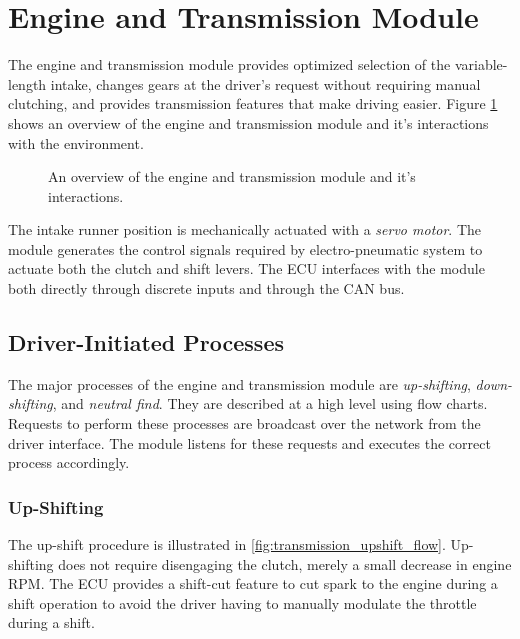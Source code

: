 \section{Engine and Transmission Module\label{sec:engine_transmission_design}}

The engine and transmission module provides optimized selection of the variable-length intake, changes gears at the driver's request without requiring manual clutching, and provides transmission features that make driving easier. Figure \ref{fig:design_engine_overview_block} shows an overview of the engine and transmission module and it's interactions with the environment.

\begin{figure}[H]
	\centering
 	
	\caption{An overview of the engine and transmission module and it's interactions.}
	\label{fig:design_engine_overview_block}
\end{figure}

The intake runner position is mechanically actuated with a \emph{servo motor}. The module generates the control signals required by electro-pneumatic system to actuate both the clutch and shift levers. The ECU interfaces with the module both directly through discrete inputs and through the CAN bus.

\subsection{Driver-Initiated Processes}

The major processes of the engine and transmission module are \emph{up-shifting}, \emph{down-shifting}, and \emph{neutral find}. They are described at a high level using flow charts. Requests to perform these processes are broadcast over the network from the driver interface. The module listens for these requests and executes the correct process accordingly.

\subsubsection{Up-Shifting}

The up-shift procedure is illustrated in \ref{fig:transmission_upshift_flow}. Up-shifting does not require disengaging the clutch, merely a small decrease in engine RPM. The ECU provides a shift-cut feature to cut spark to the engine during a shift operation to avoid the driver having to manually modulate the throttle during a shift.

